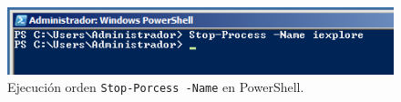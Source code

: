 \begin{figure}[H]
    \begin{center}
    \advance\leftskip-1cm
        \includegraphics[scale=0.7]{imagenes/img43}
        \caption{Ejecución orden \texttt{Stop-Porcess -Name} en PowerShell.}
        \label{fig40}
    \end{center}
\end{figure}

\newpage




